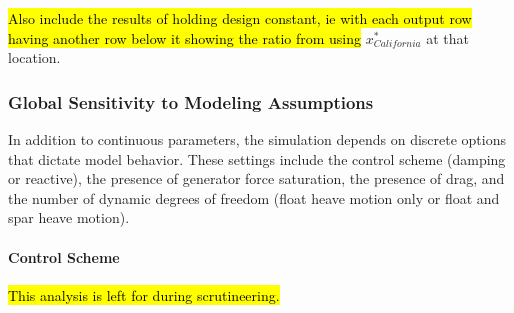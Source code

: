 \hl{Also include the results of holding design constant, ie with each output row having another row below it showing the ratio from using} $x^*_{California}$ at that location.


\subsubsection{Global Sensitivity to Modeling Assumptions}
\label{sec:sensitivity-model-assumptions}
In addition to continuous parameters, the simulation depends on discrete options that dictate model behavior. These settings include the control scheme (damping or reactive), the presence of generator force saturation, the presence of drag, and the number of dynamic degrees of freedom (float heave motion only or float and spar heave motion).

\paragraph{Control Scheme}
\hl{This analysis is left for during scrutineering.}

